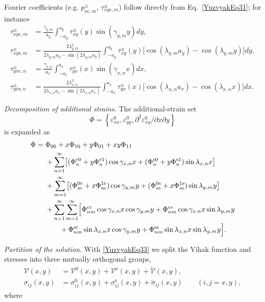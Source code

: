 Fourier coefficients (e.g. \(p_{x\mathrm c,m}^{\pm}\),  
\(\tau_{xy\mathrm c,m}^{\pm}\)) follow directly from
Eq.~\eqref{YuzvyakEq31}; for instance
\[
\begin{array}{ll}
	\tau_{xy\mathrm c ,m}^{\pm}
	&=\tfrac{\gamma_{y,m}}{a_y}
	\int_{-a_y}^{a_y} \tau_{xy}^{\pm}(y)\sin(\gamma_{y,m}y) dy,\\[3pt]
	\tau_{xy\mathrm s ,m}^{\pm}
	&=\tfrac{2\lambda_{y,m}^{2}}
	{ 2\lambda_{y,m}a_y-\sin(2\lambda_{y,m}a_y) }
	\int_{-a_y}^{a_y} \tau_{xy}^{\pm}(y)
	\bigl[\cos(\lambda_{y,m}a_y)-\cos(\lambda_{y,m}y)\bigr] dy,\\[3pt]
	\tau_{yx\mathrm c ,n}^{\pm}
	&=\tfrac{\gamma_{x,n}}{a_x}
	\int_{-a_x}^{a_x} \tau_{yx}^{\pm}(x)\sin(\gamma_{x,n}x) dx,\\[3pt]
	\tau_{yx\mathrm s ,n}^{\pm}
	&=\tfrac{2\lambda_{x,n}^{2}}
	{ 2\lambda_{x,n}a_x-\sin(2\lambda_{x,n}a_x) }
	\int_{-a_x}^{a_x} \tau_{yx}^{\pm}(x)
	\bigl[\cos(\lambda_{x,n}a_x)-\cos(\lambda_{x,n}x)\bigr] dx.
\end{array}
\]

\emph{Decomposition of additional strains.}
The additional-strain set
\[\Phi=\left\{\varepsilon_{xx}^{0}, \varepsilon_{yy}^{0},
\partial^{2}\varepsilon_{xy}^{0}/\partial x\partial y\right\}\]
is expanded as
\begin{align}
	\Phi={}&
	\Phi_{00}+x\Phi_{10}+y\Phi_{01}+xy\Phi_{11}\notag\\
	&+\sum_{n=1}^{\infty}
	\bigl[(\Phi_{n}^{\mathrm c0}+y\Phi_{n}^{\mathrm c1})\cos\gamma_{x,n}x
	+(\Phi_{n}^{\mathrm s0}+y\Phi_{n}^{\mathrm s1})\sin\lambda_{x,n}x
	\bigr]\notag\\
	&+\sum_{m=1}^{\infty}
	\bigl[(\Phi_{m}^{0\mathrm c}+x\Phi_{m}^{1\mathrm c})\cos\gamma_{y,m}y
	+(\Phi_{m}^{0\mathrm s}+x\Phi_{m}^{1\mathrm s})\sin\lambda_{y,m}y
	\bigr]\notag\\
	&+\sum_{n=1}^{\infty}\sum_{m=1}^{\infty}
	\Bigl[
	\Phi_{nm}^{\mathrm{cc}}\cos\gamma_{x,n}x \cos\gamma_{y,m}y
	+\Phi_{nm}^{\mathrm{cs}}\cos\gamma_{x,n}x \sin\lambda_{y,m}y\notag\\
	&\qquad+\Phi_{nm}^{\mathrm{sc}}\sin\lambda_{x,n}x \cos\gamma_{y,m}y
	+\Phi_{nm}^{\mathrm{ss}}\sin\lambda_{x,n}x \sin\lambda_{y,m}y
	\Bigr].
	\label{YuzvyakEq33}
\end{align}

\emph{Partition of the solution.}
With \eqref{YuzvyakEq33} we split the Vihak function and stresses into
three mutually orthogonal groups,
\begin{align}
	\mathcal V(x,y)&=\mathcal V^{0}(x,y)+\mathcal V^{\mathrm e}(x,y)
	+\tilde{\mathcal V}(x,y),
	\label{YuzvyakEq34}\\
	\sigma_{ij}(x,y)&=\sigma_{ij}^{0}(x,y)+\sigma_{ij}^{\mathrm e}(x,y)
	+\tilde{\sigma}_{ij}(x,y)\qquad (i,j=x,y),
	\label{YuzvyakEq35}
\end{align}
where  

